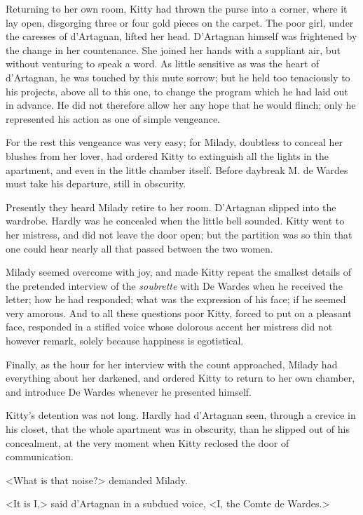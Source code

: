 Returning to her own room, Kitty had thrown the purse into a corner, where it lay open, disgorging three or four gold pieces on the carpet. The poor girl, under the caresses of d'Artagnan, lifted her head. D'Artagnan himself was frightened by the change in her countenance. She joined her hands with a suppliant air, but without venturing to speak a word. As little sensitive as was the heart of d'Artagnan, he was touched by this mute sorrow; but he held too tenaciously to his projects, above all to this one, to change the program which he had laid out in advance. He did not therefore allow her any hope that he would flinch; only he represented his action as one of simple vengeance. 

For the rest this vengeance was very easy; for Milady, doubtless to conceal her blushes from her lover, had ordered Kitty to extinguish all the lights in the apartment, and even in the little chamber itself. Before daybreak M. de Wardes must take his departure, still in obscurity. 

Presently they heard Milady retire to her room. D'Artagnan slipped into the wardrobe. Hardly was he concealed when the little bell sounded. Kitty went to her mistress, and did not leave the door open; but the partition was so thin that one could hear nearly all that passed between the two women. 

Milady seemed overcome with joy, and made Kitty repeat the smallest details of the pretended interview of the \textit{soubrette} with De Wardes when he received the letter; how he had responded; what was the expression of his face; if he seemed very amorous. And to all these questions poor Kitty, forced to put on a pleasant face, responded in a stifled voice whose dolorous accent her mistress did not however remark, solely because happiness is egotistical. 

Finally, as the hour for her interview with the count approached, Milady had everything about her darkened, and ordered Kitty to return to her own chamber, and introduce De Wardes whenever he presented himself. 

Kitty's detention was not long. Hardly had d'Artagnan seen, through a crevice in his closet, that the whole apartment was in obscurity, than he slipped out of his concealment, at the very moment when Kitty reclosed the door of communication. 

<What is that noise?> demanded Milady. 

<It is I,> said d'Artagnan in a subdued voice, <I, the Comte de Wardes.> 


